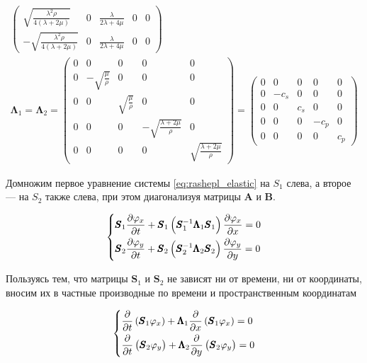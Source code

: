 \begin{gather*}
\begin{pmatrix}
        \sqrt{\frac{\lambda^2 \rho}{4\left(\lambda+2\mu\right)}} & 0 & \frac{\lambda}{2\lambda + 4\mu} & 0 & 0 \\
        -\sqrt{\frac{\lambda^2 \rho}{4\left(\lambda+2\mu\right)}} & 0 & \frac{\lambda}{2\lambda + 4\mu} & 0 & 0
    \end{pmatrix}
    \\
    \pmb{\Lambda}_1 = \pmb{\Lambda}_2 = 
    \begin{pmatrix}
        0 & 0 & 0 & 0 & 0\\
        0 & -\sqrt{\frac{\mu}{\rho}} & 0 & 0 & 0\\
        0 & 0 & \sqrt{\frac{\mu}{\rho}} & 0 & 0\\
        0 & 0 & 0 & -\sqrt{\frac{\lambda + 2\mu}{\rho}} & 0\\
        0 & 0 & 0 & 0 & \sqrt{\frac{\lambda + 2\mu}{\rho}}
    \end{pmatrix} = 
    \begin{pmatrix}
        0 & 0 & 0 & 0 & 0 \\
        0 & -c_s & 0 & 0 & 0 \\
        0 & 0 & c_s & 0 & 0 \\
        0 & 0 & 0 & -c_p & 0 \\
        0 & 0 & 0 & 0 & c_p
    \end{pmatrix}
\end{gather*}

Домножим первое уравнение системы \eqref{eq:rashepl_elastic} на $S_1$ слева, а второе --- на $S_2$ также слева, при этом диагонализуя матрицы $\pmb{A}$ и $\pmb{B}$.

\begin{equation*}
\begin{dcases}
    \pmb{S}_1  \dfrac{\partial \varphi_x}{\partial t} +
    \pmb{S}_1 \left(\pmb{S}^{-1}_1 \pmb{\Lambda}_1 \pmb{S}_1 \right) \dfrac{\partial \varphi_x}{\partial x} = 0 \\
    \pmb{S}_2 \dfrac{\partial \varphi_y}{\partial t} + 
    \pmb{S}_2  \left(\pmb{S}^{-1}_2 \pmb{\Lambda}_2 \pmb{S}_2\right) \dfrac{\partial \varphi_y}{\partial y} = 0
\end{dcases}
\end{equation*}

Пользуясь тем, что матрицы $\pmb{S}_1$ и $\pmb{S}_2$ не зависят ни от времени, ни от координаты, вносим их в частные производные по времени и пространственным координатам 

\begin{equation*}
\begin{dcases}
    \dfrac{\partial}{\partial t} \left(\pmb{S}_1 \varphi_x\right) +
    \pmb{\Lambda}_1 \dfrac{\partial}{\partial x} \left(\pmb{S}_1 \varphi_x\right) = 0 \\
    \dfrac{\partial}{\partial t} \left(\pmb{S}_2 \varphi_y\right) + 
    \pmb{\Lambda}_2 \dfrac{\partial}{\partial y} \left(\pmb{S}_2 \varphi_y\right) = 0
\end{dcases}
\end{equation*}


